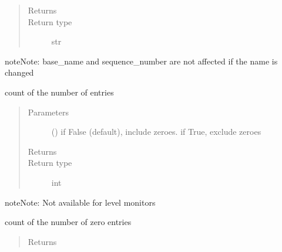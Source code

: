 \documentclass[letterpaper,10pt,english]{sphinxmanual}
\begin{document}
\begin{fulllineitems}
\begin{fulllineitems}
\begin{quote}
\begin{description}
\item[{Returns}] \leavevmode
{}

\item[{Return type}] \leavevmode
str

\end{description}\end{quote}

\begin{sphinxadmonition}{note}{Note:}
base\_name and sequence\_number are not affected if the name is changed
\end{sphinxadmonition}

\end{fulllineitems}


\begin{fulllineitems}
\label{\detokenize{Reference:salabim.Monitor.number_of_entries}}
count of the number of entries
\begin{quote}\begin{description}
\item[{Parameters}] \leavevmode
{} () \textendash{} if False (default), include zeroes. if True, exclude zeroes

\item[{Returns}] \leavevmode
{}

\item[{Return type}] \leavevmode
int

\end{description}\end{quote}

\begin{sphinxadmonition}{note}{Note:}
Not available for level monitors
\end{sphinxadmonition}

\end{fulllineitems}


\begin{fulllineitems}
\label{\detokenize{Reference:salabim.Monitor.number_of_entries_zero}}
count of the number of zero entries
\begin{quote}\begin{description}
\item[{Returns}] \leavevmode
{}


\end{description}
\end{quote}
\end{fulllineitems}
\end{fulllineitems}
\end{document}
